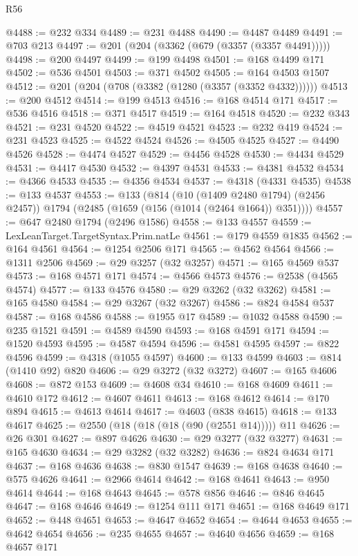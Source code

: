 \begin{lexlean}{R56}
\begin{coremodule}
@4488 := @232 @334
@4489 := @231 @4488
@4490 := @4487 @4489
@4491 := @703 @213
@4497 := @201 (@204 (@3362 (@679 (@3357 (@3357 @4491)))))
@4498 := @200 @4497
@4499 := @199 @4498
@4501 := @168 @4499 @171
@4502 := @536 @4501
@4503 := @371 @4502
@4505 := @164 @4503 @1507
@4512 := @201 (@204 (@708 (@3382 (@1280 (@3357 (@3352 @4332))))))
@4513 := @200 @4512
@4514 := @199 @4513
@4516 := @168 @4514 @171
@4517 := @536 @4516
@4518 := @371 @4517
@4519 := @164 @4518
@4520 := @232 @343
@4521 := @231 @4520
@4522 := @4519 @4521
@4523 := @232 @419
@4524 := @231 @4523
@4525 := @4522 @4524
@4526 := @4505 @4525
@4527 := @4490 @4526
@4528 := @4474 @4527
@4529 := @4456 @4528
@4530 := @4434 @4529
@4531 := @4417 @4530
@4532 := @4397 @4531
@4533 := @4381 @4532
@4534 := @4366 @4533
@4535 := @4356 @4534
@4537 := @4318 (@4331 @4535)
@4538 := @133 @4537
@4553 := @133
    (@814
      (@10 (@1409 @2480 @1794) (@2456 @2457))
      @1794
      (@2485 (@1659 (@156 (@1014 (@2464 @1664)) @351))))
@4557 := @647 @2480 @1794 (@2496 @1586)
@4558 := @133 @4557
@4559 := LexLeanTarget.TargetSyntax.Prim.natLe
@4561 := @179 @4559 @1835
@4562 := @164 @4561
@4564 := @1254 @2506 @171
@4565 := @4562 @4564
@4566 := @1311 @2506
@4569 := @29 @3257 (@32 @3257)
@4571 := @165 @4569 @537
@4573 := @168 @4571 @171
@4574 := @4566 @4573
@4576 := @2538 (@4565 @4574)
@4577 := @133 @4576
@4580 := @29 @3262 (@32 @3262)
@4581 := @165 @4580
@4584 := @29 @3267 (@32 @3267)
@4586 := @824 @4584 @537
@4587 := @168 @4586
@4588 := @1955 @17
@4589 := @1032 @4588
@4590 := @235 @1521
@4591 := @4589 @4590
@4593 := @168 @4591 @171
@4594 := @1520 @4593
@4595 := @4587 @4594
@4596 := @4581 @4595
@4597 := @822 @4596
@4599 := @4318 (@1055 @4597)
@4600 := @133 @4599
@4603 := @814 (@1410 @92) @820
@4606 := @29 @3272 (@32 @3272)
@4607 := @165 @4606
@4608 := @872 @153
@4609 := @4608 @34
@4610 := @168 @4609
@4611 := @4610 @172
@4612 := @4607 @4611
@4613 := @168 @4612
@4614 := @170 @894
@4615 := @4613 @4614
@4617 := @4603 (@838 @4615)
@4618 := @133 @4617
@4625 := @2550 (@18 (@18 (@18 (@90 (@2551 @14))))) @11
@4626 := @26 @301
@4627 := @897 @4626
@4630 := @29 @3277 (@32 @3277)
@4631 := @165 @4630
@4634 := @29 @3282 (@32 @3282)
@4636 := @824 @4634 @171
@4637 := @168 @4636
@4638 := @830 @1547
@4639 := @168 @4638
@4640 := @575 @4626
@4641 := @2966 @4614
@4642 := @168 @4641
@4643 := @950 @4614
@4644 := @168 @4643
@4645 := @578 @856
@4646 := @846 @4645
@4647 := @168 @4646
@4649 := @1254 @111 @171
@4651 := @168 @4649 @171
@4652 := @448 @4651
@4653 := @4647 @4652
@4654 := @4644 @4653
@4655 := @4642 @4654
@4656 := @235 @4655
@4657 := @4640 @4656
@4659 := @168 @4657 @171

\end{coremodule}
\end{lexlean}
